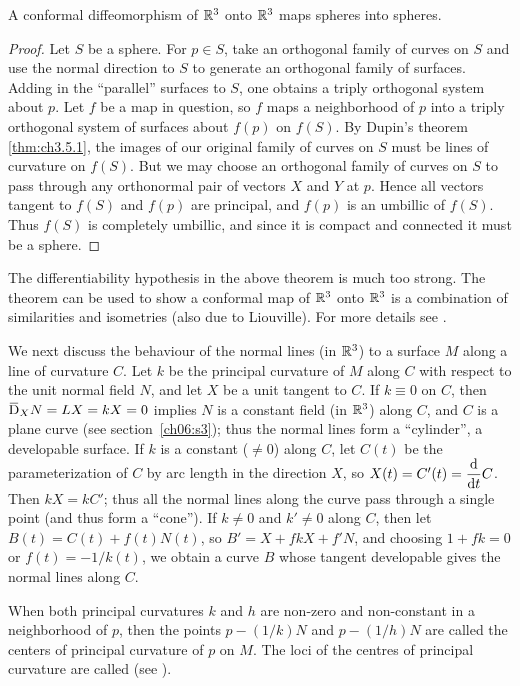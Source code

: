 \documentclass[../main]{subfiles}
\begin{document}
\begin{theorem}[Liouville] \label{thm:ch3.5.2}
A conformal diffeomorphism of $\mathbb{R}^3$ onto $\mathbb{R}^3$ maps spheres into spheres.
\end{theorem}

\begin{proof}
Let $S$ be a sphere. For $p\in S$, take an orthogonal family of curves on $S$ and use the normal direction to $S$ to generate an orthogonal family of surfaces. Adding in the ``parallel'' surfaces to $S$, one obtains a triply orthogonal system about $p$. Let $f$ be a map in question, so $f$ maps a neighborhood of $p$ into a triply orthogonal system of surfaces about $f(p)$ on $f(S)$. By Dupin's theorem \ref{thm:ch3.5.1}, the images of our original family of curves on $S$ must be lines of curvature on $f(S)$. But we may choose an orthogonal family of curves on $S$ to pass through any orthonormal pair of vectors $X$ and $Y$ at $p$. Hence all vectors tangent to $f(S)$ and $f(p)$ are principal, and $f(p)$ is an umbillic of $f(S)$. Thus $f(S)$ is completely umbillic, and since it is compact and connected it must be a sphere.
\end{proof}



The differentiability hypothesis in the above theorem is much too strong. The theorem can be used to show a conformal map of $\mathbb{R}^3$ onto $\mathbb{R}^3$ is a combination of similarities and isometries (also due to Liouville). For more details see \cite[p.225]{guggenheimer2012differential}.

We next discuss the behaviour of the normal lines (in $\mathbb{R}^3$) to a surface $M$ along a line of curvature $C$. Let $k$ be the principal curvature of $M$ along $C$ with respect to the unit normal field $N$, and let $X$ be a unit tangent to $C$. If $k \equiv 0$ on $C$, then $\covariant_X N = LX = kX = 0$ implies $N$ is a constant field (in $\mathbb{R}^3$) along $C$, and $C$ is a plane curve (see section~\ref{ch06:s3}); thus the normal lines form a ``cylinder'', a developable surface. If $k$ is a constant ($\ne 0$) along $C$, let $C(t)$ be the parameterization of $C$ by arc length in the direction $X$, so $X(t) = C'(t) = \dv{}{t}C$. Then $k X = k C'$; thus all the normal lines along the curve pass through a single point (and thus form a ``cone''). If $k \ne 0$ and $k' \ne 0$ along $C$, then let $B(t) = C(t) + f(t)N(t)$, so $B' = X + f k X + f' N$, and choosing $1 + fk = 0$ or $f(t) = -1/k(t)$, we obtain a curve $B$ whose tangent developable gives the normal lines along $C$. 

When both principal curvatures $k$ and $h$ are non-zero and non-constant in a neighborhood of $p$, then the points $p - (1/k)N$ and $p - (1/h)N$ are called the centers of principal curvature of $p$ on $M$. The loci of the centres of principal curvature are called  (see \cite[p.~95]{struik1961lectures}).
\end{document}
